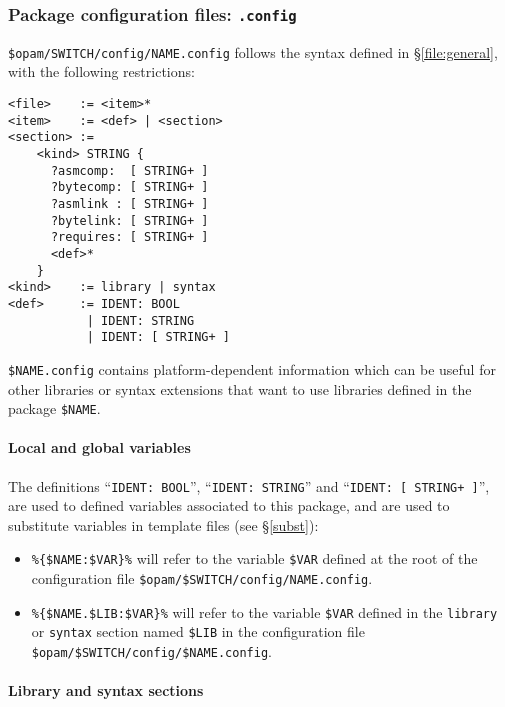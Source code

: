 \documentclass[a4paper,10pt]{article}
\begin{document}
\subsubsection{Package configuration files: {\tt *.config}}
\label{file:dotconfig}

\verb+$opam/SWITCH/config/NAME.config+ follows the syntax defined in
\S\ref{file:general}, with the following restrictions:

{\small
\begin{Verbatim}[frame=single]
<file>    := <item>*
<item>    := <def> | <section>
<section> :=
    <kind> STRING {
      ?asmcomp:  [ STRING+ ]
      ?bytecomp: [ STRING+ ]
      ?asmlink : [ STRING+ ]
      ?bytelink: [ STRING+ ]
      ?requires: [ STRING+ ]
      <def>*
    }
<kind>    := library | syntax
<def>     := IDENT: BOOL
           | IDENT: STRING
           | IDENT: [ STRING+ ]
\end{Verbatim}
}

\verb+$NAME.config+ contains platform-dependent information which can
be useful for other libraries or syntax extensions that want to use
libraries defined in the package \verb+$NAME+.

\paragraph{Local and global variables}

The definitions ``{\tt IDENT: BOOL}'', ``{\tt IDENT: STRING}'' and ``{\tt IDENT:
  [ STRING+ ]}'', are used to defined variables associated to this
package, and are used to substitute variables in template files (see
\S\ref{subst}):

\begin{itemize}

\item \verb+%{$NAME:$VAR}%+ will refer to the variable \verb+$VAR+
  defined at the root of the configuration file \verb+$opam/$SWITCH/config/NAME.config+.

\item \verb+%{$NAME.$LIB:$VAR}%+ will refer to the variable \verb+$VAR+
  defined in the {\tt library} or {\tt syntax} section named
  \verb+$LIB+ in the configuration file \verb+$opam/$SWITCH/config/$NAME.config+.

\end{itemize}

\paragraph{Library and syntax sections}
\end{document}
